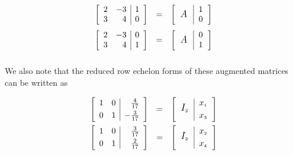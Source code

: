 \[ \begin{array}{rcl}

\left[ \begin{array}{rr|r} 2 & -3 & 1 \\ 3 & 4 & 0 \\ \end{array} \right] & = & \left[ \begin{tabular}{c|r}
\multirow{2}{10pt}{\large \textit{A}} & 1 \\ & 0 \end{tabular} \right] \\ [13pt]

\left[ \begin{array}{rr|r} 2 & -3 & 0 \\ 3 & 4 & 1 \\ \end{array} \right] & = & \left[ \begin{tabular}{c|r} \multirow{2}{10pt}{\large \textit{A}} & 0 \\ & 1 \end{tabular} \right] \\ [13pt]

\end{array} \]

We also note that the reduced row echelon forms of these augmented matrices can be written as

\[ \begin{array}{rcl}

\left[ \begin{array}{rr|r} 1 & 0 & \frac{4}{17} \\[3pt] 0 & 1 & -\frac{3}{17} \\ \end{array} \right] & = & \left[ \begin{tabular}{c|r} \multirow{2}{10pt}{\large $I_{\mbox{\tiny$2$}}$} & $x_{\mbox{\tiny$1$}}$ \\[3pt] &  $x_{\mbox{\tiny$3$}}$ \end{tabular} \right]\\ [13pt]

\left[ \begin{array}{rr|r} 1 & 0 & \hphantom{-}\frac{3}{17} \\[3pt] 0 & 1 & \frac{2}{17} \\ \end{array} \right] & = & \left[ \begin{tabular}{c|r} \multirow{2}{10pt}{\large $I_{\mbox{\tiny$2$}}$} & $x_{\mbox{\tiny$2$}}$ \\[3pt] & $x_{\mbox{\tiny$4$}}$ \end{tabular} \right]

\end{array} \]

